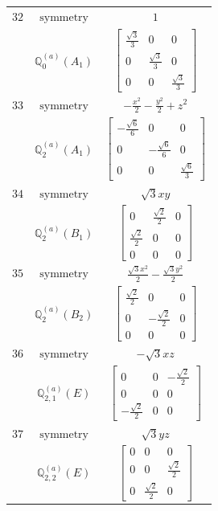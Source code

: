 \documentclass[fleqn,8pt,landscape]{jsarticle}
\begin{document}
\begin{longtable}{ccc}
$ 32 $ & $ \text{symmetry} $ & $ 1 $ \\
$  $ & $ \mathbb{Q}_{0}^{(a)}(A_{1}) $ & $ \begin{bmatrix} \frac{\sqrt{3}}{3} & 0 & 0 \\ 0 & \frac{\sqrt{3}}{3} & 0 \\ 0 & 0 & \frac{\sqrt{3}}{3} \end{bmatrix} $ \\ \hline
$ 33 $ & $ \text{symmetry} $ & $ - \frac{x^{2}}{2} - \frac{y^{2}}{2} + z^{2} $ \\
$  $ & $ \mathbb{Q}_{2}^{(a)}(A_{1}) $ & $ \begin{bmatrix} - \frac{\sqrt{6}}{6} & 0 & 0 \\ 0 & - \frac{\sqrt{6}}{6} & 0 \\ 0 & 0 & \frac{\sqrt{6}}{3} \end{bmatrix} $ \\ \hline
$ 34 $ & $ \text{symmetry} $ & $ \sqrt{3} x y $ \\
$  $ & $ \mathbb{Q}_{2}^{(a)}(B_{1}) $ & $ \begin{bmatrix} 0 & \frac{\sqrt{2}}{2} & 0 \\ \frac{\sqrt{2}}{2} & 0 & 0 \\ 0 & 0 & 0 \end{bmatrix} $ \\ \hline
$ 35 $ & $ \text{symmetry} $ & $ \frac{\sqrt{3} x^{2}}{2} - \frac{\sqrt{3} y^{2}}{2} $ \\
$  $ & $ \mathbb{Q}_{2}^{(a)}(B_{2}) $ & $ \begin{bmatrix} \frac{\sqrt{2}}{2} & 0 & 0 \\ 0 & - \frac{\sqrt{2}}{2} & 0 \\ 0 & 0 & 0 \end{bmatrix} $ \\ \hline
$ 36 $ & $ \text{symmetry} $ & $ - \sqrt{3} x z $ \\
$  $ & $ \mathbb{Q}_{2,1}^{(a)}(E) $ & $ \begin{bmatrix} 0 & 0 & - \frac{\sqrt{2}}{2} \\ 0 & 0 & 0 \\ - \frac{\sqrt{2}}{2} & 0 & 0 \end{bmatrix} $ \\ \hline
$ 37 $ & $ \text{symmetry} $ & $ \sqrt{3} y z $ \\
$  $ & $ \mathbb{Q}_{2,2}^{(a)}(E) $ & $ \begin{bmatrix} 0 & 0 & 0 \\ 0 & 0 & \frac{\sqrt{2}}{2} \\ 0 & \frac{\sqrt{2}}{2} & 0 \end{bmatrix} $ \\ \hline

\end{longtable}
\end{document}

